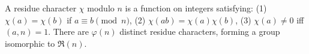 A residue character $\chi$ modulo $n$ is a function on integers satisfying: (1) $\chi(a)=\chi(b)$ if $a \equiv b \pmod{n}$, (2) $\chi(ab)=\chi(a)\chi(b)$, (3) $\chi(a) \neq 0$ iff $(a,n)=1$. There are $\varphi(n)$ distinct residue characters, forming a group isomorphic to $\Re(n)$.
